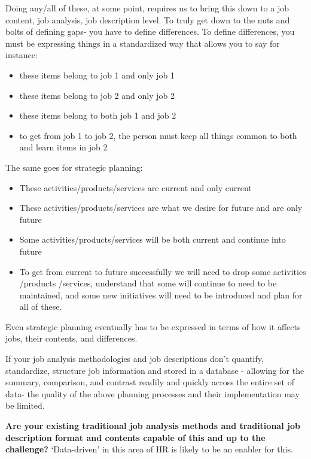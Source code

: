 \documentclass[12pt,letterpaper]{article}
\begin{document}
{{{Doing any/all of these, at some point, requires us to bring this down to
a job content, job analysis, job description level. To truly get down to
the nuts and bolts of defining gaps- you have to define differences. To
define differences, you must be expressing things in a standardized way
that allows you to say for instance:

\begin{itemize}
\item
  these items belong to job 1 and only job 1
\item
  these items belong to job 2 and only job 2
\item
  these items belong to both job 1 and job 2
\item
  to get from job 1 to job 2, the person must keep all things common to
  both and learn items in job 2
\end{itemize}

The same goes for strategic planning:

\begin{itemize}
\item
  These activities/products/services are current and only current
\item
  These activities/products/services are what we desire for future and
  are only future
\item
  Some activities/products/services will be both current and continue
  into future
\item
  To get from current to future successfully we will need to drop some
  activities /products /services, understand that some will continue to
  need to be maintained, and some new initiatives will need to be
  introduced and plan for all of these.
\end{itemize}

Even strategic planning eventually has to be expressed in terms of how
it affects jobs, their contents, and differences.

If your job analysis methodologies and job descriptions don't quantify,
standardize, structure job information and stored in a database -
allowing for the summary, comparison, and contrast readily and quickly
across the entire set of data- the quality of the above planning
processes and their implementation may be limited.

\textbf{Are your existing traditional job analysis methods and
traditional job description format and contents capable of this and up
to the challenge?} `Data-driven' in this area of HR is likely to be an
enabler for this.

}}}
\end{document}
